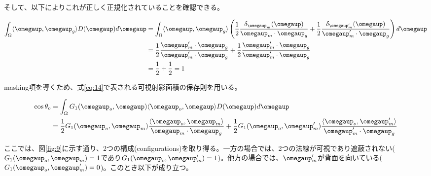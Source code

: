 \documentclass[a4j,xelatex,ja=standard]{bxjsarticle}
\begin{document}
そして、以下によりこれが正しく正規化されていることを確認できる。

\begin{equation}
    \begin{split}
        \int_{\Omega} \langle \boldsymbol{\omegaup}, \boldsymbol{\omegaup}_g \rangle D(\boldsymbol{\omegaup}) d\boldsymbol{\omegaup}
        &= \int_{\Omega} \langle \boldsymbol{\omegaup}, \boldsymbol{\omegaup}_g \rangle \left( \frac{1}{2} \frac{\delta_{\boldsymbol{\omegaup}_m}(\boldsymbol{\omegaup})}{\boldsymbol{\omegaup}_m \cdot \boldsymbol{\omegaup}_g} + \frac{1}{2} \frac{\delta_{\boldsymbol{\omegaup}_m'}(\boldsymbol{\omegaup})}{\boldsymbol{\omegaup}_m' \cdot \boldsymbol{\omegaup}_g} \right) d\boldsymbol{\omegaup} \\
        &= \frac{1}{2} \frac{\boldsymbol{\omegaup}_m' \cdot \boldsymbol{\omegaup}_g}{\boldsymbol{\omegaup}_m' \cdot \boldsymbol{\omegaup}_g} + \frac{1}{2} \frac{\boldsymbol{\omegaup}_m' \cdot \boldsymbol{\omegaup}_g}{\boldsymbol{\omegaup}_m' \cdot \boldsymbol{\omegaup}_g} \\
        &= \frac{1}{2} + \frac{1}{2} = 1
    \end{split}
    \label{eq:45}
\end{equation}

masking項を導くため、式\eqref{eq:14}で表される可視射影面積の保存則を用いる。

\begin{equation}
    \begin{split}
        \cos\theta_o
        &= \int_{\Omega} G_1(\boldsymbol{\omegaup}_o, \boldsymbol{\omegaup}) \langle \boldsymbol{\omegaup}_o, \boldsymbol{\omegaup} \rangle D(\boldsymbol{\omegaup}) d\boldsymbol{\omegaup} \\
        &= \frac{1}{2} G_1(\boldsymbol{\omegaup}_o, \boldsymbol{\omegaup}_m) \frac{\langle \boldsymbol{\omegaup}_o, \boldsymbol{\omegaup}_m \rangle}{\boldsymbol{\omegaup}_m \cdot \boldsymbol{\omegaup}_g} + \frac{1}{2} G_1(\boldsymbol{\omegaup}_o, \boldsymbol{\omegaup}_m') \frac{\langle \boldsymbol{\omegaup}_o, \boldsymbol{\omegaup}_m' \rangle}{\boldsymbol{\omegaup}_m' \cdot \boldsymbol{\omegaup}_g}
    \end{split}
    \label{eq:46}
\end{equation}

ここでは、図\ref{fig:9}に示す通り、2つの構成(configurations)を取り得る。一方の場合では、2つの法線が可視であり遮蔽されない($G_1(\boldsymbol{\omegaup}_o, \boldsymbol{\omegaup}_m) = 1$であり$G_1(\boldsymbol{\omegaup}_o, \boldsymbol{\omegaup}_m') = 1$)。他方の場合では、$\boldsymbol{\omegaup}_m'$が背面を向いている($G_1(\boldsymbol{\omegaup}_o, \boldsymbol{\omegaup}_m') = 0$)。このとき以下が成り立つ。
\end{document}
